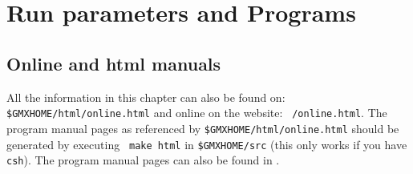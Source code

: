 \chapter{Run parameters and Programs}
\label{ch:programs}

\section{Online and html manuals}
All the information in this chapter can also be found on: {\tt
\$GMXHOME/html/online.html} and online on the {\gromacs} website: {\tt
\wwwpage/online\gmxver.html}. The program manual pages as referenced by
{\tt \$GMXHOME/html/online.html} should be generated by executing {\tt
make html} in {\tt \$GMXHOME/src} (this only works if you have {\tt
csh}). The program manual pages can also be found in
.

\section{}


\section{}

